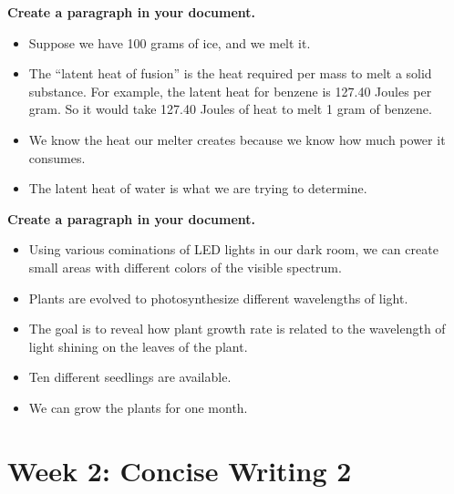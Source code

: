 \documentclass{article}
\begin{document}
\begin{enumerate}
\textbf{Create a paragraph in your document.} 
\begin{itemize}
\item Suppose we have 100 grams of ice, and we melt it.
\item The ``latent heat of fusion'' is the heat required per mass to melt a solid substance.  For example, the latent heat for benzene is 127.40 Joules per gram.  So it would take 127.40 Joules of heat to melt 1 gram of benzene.
\item We know the heat our melter creates because we know how much power it consumes.
\item The latent heat of water is what we are trying to determine.
\end{itemize}
\textbf{Create a paragraph in your document.} 
\begin{itemize}
\item Using various cominations of LED lights in our dark room, we can create small areas with different colors of the visible spectrum.
\item Plants are evolved to photosynthesize different wavelengths of light.
\item The goal is to reveal how plant growth rate is related to the wavelength of light shining on the leaves of the plant.
\item Ten different seedlings are available.
\item We can grow the plants for one month.
\end{itemize}
\end{enumerate}

\section{Week 2: Concise Writing 2}
\end{document}
